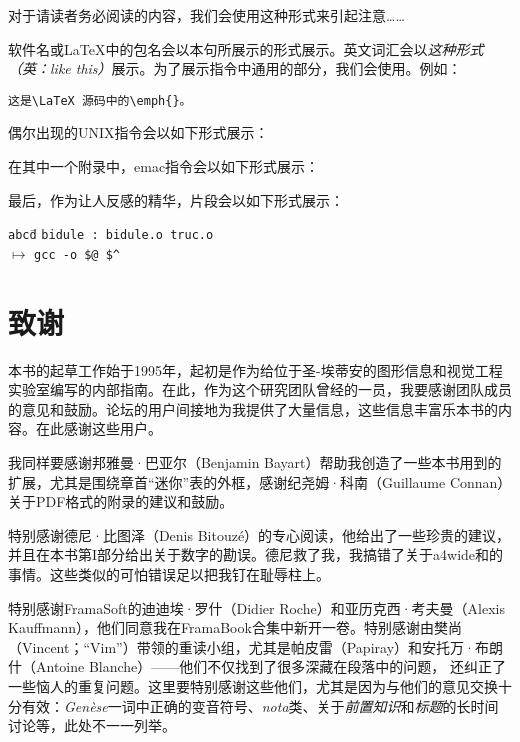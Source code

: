 \begin{exclamation}
对于请读者务必阅读的内容，我们会使用这种形式来引起注意……\\
\end{exclamation}

\textsf{软件名}或\LaTeX 中的\textsf{包名}会以本句所展示的形式展示。英文词汇会以\emph{这种形式（英：like this）}展示。为了展示指令中通用的部分，我们会使用。例如：

\begin{dmd}
\verb|这是\LaTeX 源码中的\emph{|\verb|}。|
\end{dmd}

偶尔出现的UNIX指令会以如下形式展示：


在其中一个附录中，\textsf{emac}指令会以如下形式展示：


最后，作为让人反感的精华，片段会以如下形式展示：

\begin{mdframed}
\begin{tabbing}
\verb|abcd|\=\kill
\verb|bidule : bidule.o truc.o|\\
$\longmapsto$ \>\verb|gcc -o $@ $^|
\end{tabbing}
\end{mdframed}

\section*{致谢}

本书的起草工作始于1995年，起初是作为给位于圣-埃蒂安的图形信息和视觉工程实验室编写的内部指南。在此，作为这个研究团队曾经的一员，我要感谢团队成员的意见和鼓励。论坛的用户间接地为我提供了大量信息，这些信息丰富乐本书的内容。在此感谢这些用户。

我同样要感谢邦雅曼·巴亚尔（Benjamin Bayart）帮助我创造了一些本书用到的扩展，尤其是围绕章首“迷你”表的外框，感谢纪尧姆·科南（Guillaume Connan）关于PDF格式的附录的建议和鼓励。

特别感谢德尼·比图泽（Denis Bitouzé）的专心阅读，他给出了一些珍贵的建议，并且在本书第I部分给出关于数字的勘误。德尼救了我，我搞错了关于\textsf{a4wide}和的事情。这些类似的可怕错误足以把我钉在耻辱柱上。

特别感谢FramaSoft的迪迪埃·罗什（Didier Roche）和亚历克西·考夫曼（Alexis Kauffmann），他们同意我在FramaBook合集中新开一卷。特别感谢由樊尚（Vincent；“Vim”）带领的重读小组，尤其是帕皮雷（Papiray）和安托万·布朗什（Antoine Blanche）——他们不仅找到了很多深藏在段落中的问题， 还纠正了一些恼人的重复问题。这里要特别感谢这些他们，尤其是因为与他们的意见交换十分有效：\textsl{Genèse}一词中正确的变音符号、\textsl{nota}类、关于\textsl{前置知识}和\textsl{标题}的长时间讨论等，此处不一一列举。

